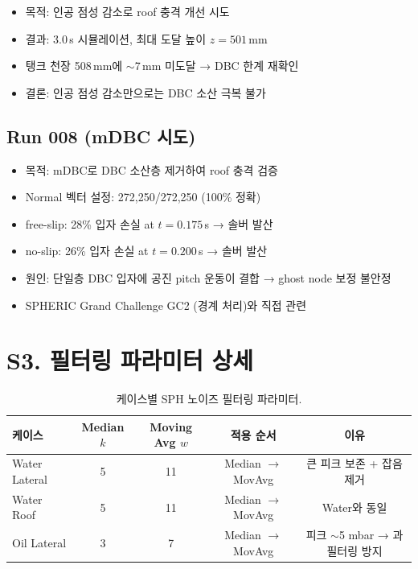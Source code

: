 \documentclass[a4paper,11pt]{article}
\begin{document}
\begin{itemize}
    \item 목적: 인공 점성 감소로 roof 충격 개선 시도
    \item 결과: 3.0\,s 시뮬레이션, 최대 도달 높이 $z = 501$\,mm
    \item 탱크 천장 508\,mm에 $\sim$7\,mm 미도달 → DBC 한계 재확인
    \item 결론: 인공 점성 감소만으로는 DBC 소산 극복 불가
\end{itemize}

\subsection{Run 008 (mDBC 시도)}

\begin{itemize}
    \item 목적: mDBC로 DBC 소산층 제거하여 roof 충격 검증
    \item Normal 벡터 설정: 272,250/272,250 (100\% 정확)
    \item free-slip: 28\% 입자 손실 at $t = 0.175$\,s → 솔버 발산
    \item no-slip: 26\% 입자 손실 at $t = 0.200$\,s → 솔버 발산
    \item 원인: 단일층 DBC 입자에 공진 pitch 운동이 결합 → ghost node 보정 불안정
    \item SPHERIC Grand Challenge GC2 (경계 처리)와 직접 관련
\end{itemize}


\section{S3. 필터링 파라미터 상세} \label{sec:s3}

\begin{table}[h]
\caption{케이스별 SPH 노이즈 필터링 파라미터.}
\centering
\begin{tabular}{@{}lcccc@{}}
\toprule
케이스 & Median $k$ & Moving Avg $w$ & 적용 순서 & 이유 \\
\midrule
Water Lateral & 5 & 11 & Median $\to$ MovAvg & 큰 피크 보존 + 잡음 제거 \\
Water Roof & 5 & 11 & Median $\to$ MovAvg & Water와 동일 \\
Oil Lateral & 3 & 7 & Median $\to$ MovAvg & 피크 $\sim$5 mbar → 과필터링 방지 \\
\bottomrule
\end{tabular}
\end{table}
\end{document}
